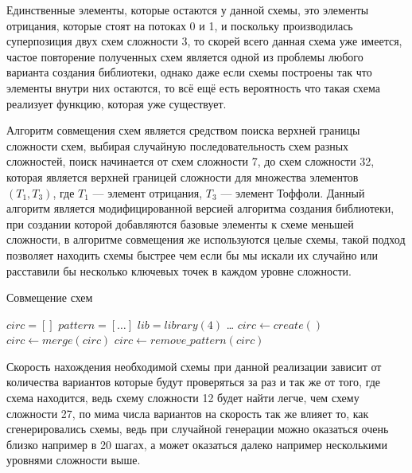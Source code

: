 \documentclass[14pt]{extarticle} %
\begin{document}
Единственные элементы, которые остаются у данной схемы, это элементы отрицания, которые стоят на потоках 0 и 1, и поскольку производилась суперпозиция двух схем сложности 3, то скорей всего данная схема уже имеется, частое повторение полученных схем является одной из проблемы любого варианта создания библиотеки, однако даже если схемы построены так что элементы внутри них остаются, то всё ещё есть вероятность что такая схема реализует функцию, которая уже существует.

Алгоритм совмещения схем является средством поиска верхней границы сложности схем, выбирая случайную последовательность схем разных сложностей, поиск начинается от схем сложности 7, до схем сложности 32, которая является верхней границей сложности для множества элементов $(T_{1},T_{3})$, где $T_{1}$ --- элемент отрицания, $T_{3}$ --- элемент Тоффоли. Данный алгоритм является модифицированной версией алгоритма создания библиотеки, при создании которой добавляются базовые элементы к схеме меньшей сложности, в алгоритме совмещения же используются целые схемы, такой подход позволяет находить схемы быстрее чем если бы мы искали их случайно или расставили бы несколько ключевых точек в каждом уровне сложности.


  \begin{algorithm}
	\caption{Совмещение схем}\label{alg:bib}
	\begin{algorithmic}[1]
		
		\State $circ=[]$
		\State $pattern=[\ldots]$
		\State $lib=library(4)$
		\State \ldots
		\EndFor
		\EndFunction
		\While
		\State $circ \leftarrow create()$
		\State $circ \leftarrow merge(circ)$
		\State $circ \leftarrow remove\_pattern(circ)$
		\EndWhile
		\EndProcedure
		
		
	\end{algorithmic}
\end{algorithm}

Скорость нахождения необходимой схемы при данной реализации зависит от количества вариантов которые будут проверяться за раз и так же от того, где схема находится, ведь схему сложности 12 будет найти легче, чем схему сложности 27, по мима числа вариантов на скорость так же влияет то, как сгенерировались схемы, ведь при случайной генерации можно оказаться очень близко например в 20 шагах, а может оказаться далеко например несколькими уровнями сложности выше.
\end{document}
